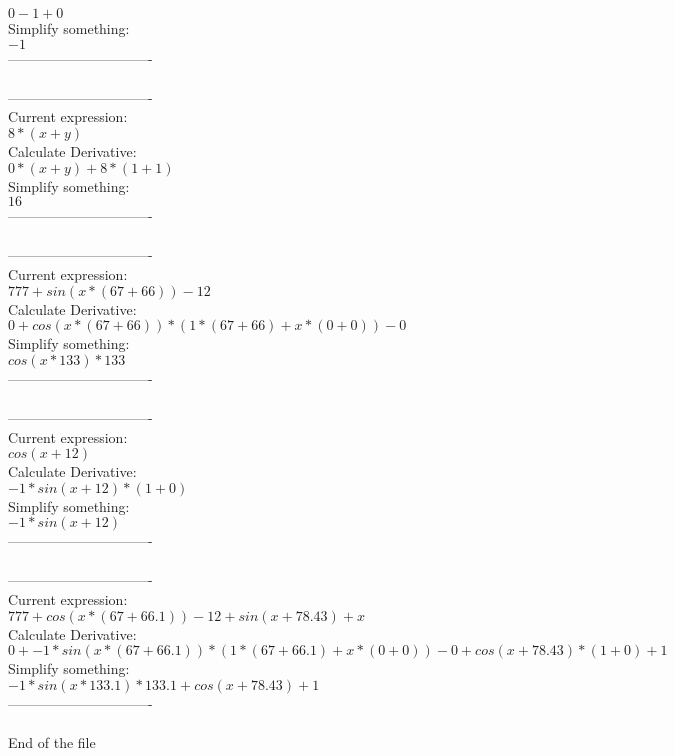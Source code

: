 \documentclass[12pt]{article}
\begin{document}
\( 0-1+0\) \\
Simplify something:\\
\( -1\) \\
-------------------------------\\
\\
-------------------------------\\
Current expression:\\
\( 8*(x+y)\) \\
Calculate Derivative:\\
\( 0*(x+y)+8*(1+1)\) \\
Simplify something:\\
\( 16\) \\
-------------------------------\\
\\
-------------------------------\\
Current expression:\\
\( 777+sin(x*(67+66))-12\) \\
Calculate Derivative:\\
\( 0+cos(x*(67+66))*(1*(67+66)+x*(0+0))-0\) \\
Simplify something:\\
\( cos(x*133)*133\) \\
-------------------------------\\
\\
-------------------------------\\
Current expression:\\
\( cos(x+12)\) \\
Calculate Derivative:\\
\( -1*sin(x+12)*(1+0)\) \\
Simplify something:\\
\( -1*sin(x+12)\) \\
-------------------------------\\
\\
-------------------------------\\
Current expression:\\
\( 777+cos(x*(67+66.1))-12+sin(x+78.43)+x\) \\
Calculate Derivative:\\
\( 0+-1*sin(x*(67+66.1))*(1*(67+66.1)+x*(0+0))-0+cos(x+78.43)*(1+0)+1\) \\
Simplify something:\\
\( -1*sin(x*133.1)*133.1+cos(x+78.43)+1\) \\
-------------------------------\\
\\

        End of the file
        
\end{document}
